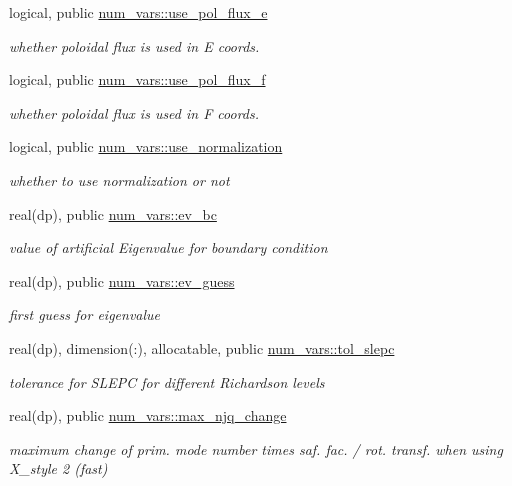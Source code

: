 \begin{DoxyCompactItemize}
logical, public \hyperlink{namespacenum__vars_adedd3c1e77cfdf75dac84e43ee54497a}{num\+\_\+vars\+::use\+\_\+pol\+\_\+flux\+\_\+e}
\begin{DoxyCompactList}\small\item\em whether poloidal flux is used in E coords. \end{DoxyCompactList}\item 
logical, public \hyperlink{namespacenum__vars_ae21ec57b791e369c3558c0eb3da1555b}{num\+\_\+vars\+::use\+\_\+pol\+\_\+flux\+\_\+f}
\begin{DoxyCompactList}\small\item\em whether poloidal flux is used in F coords. \end{DoxyCompactList}\item 
logical, public \hyperlink{namespacenum__vars_a585ed16ea01f299cd764690f057af2c6}{num\+\_\+vars\+::use\+\_\+normalization}
\begin{DoxyCompactList}\small\item\em whether to use normalization or not \end{DoxyCompactList}\item 
real(dp), public \hyperlink{namespacenum__vars_a4efc3cca2482236a18b8927bca8361c2}{num\+\_\+vars\+::ev\+\_\+bc}
\begin{DoxyCompactList}\small\item\em value of artificial Eigenvalue for boundary condition \end{DoxyCompactList}\item 
real(dp), public \hyperlink{namespacenum__vars_a4c19f47e50c92bfd52985761500a999e}{num\+\_\+vars\+::ev\+\_\+guess}
\begin{DoxyCompactList}\small\item\em first guess for eigenvalue \end{DoxyCompactList}\item 
real(dp), dimension(\+:), allocatable, public \hyperlink{namespacenum__vars_acbfccf15a8af9fce37f9cb3f2c85be76}{num\+\_\+vars\+::tol\+\_\+slepc}
\begin{DoxyCompactList}\small\item\em tolerance for S\+L\+E\+PC for different Richardson levels \end{DoxyCompactList}\item 
real(dp), public \hyperlink{namespacenum__vars_a2f7c3870fc9449cf70e4bf44612a8b9a}{num\+\_\+vars\+::max\+\_\+njq\+\_\+change}
\begin{DoxyCompactList}\small\item\em maximum change of prim. mode number times saf. fac. / rot. transf. when using X\+\_\+style 2 (fast) \end{DoxyCompactList}\item 

\end{DoxyCompactItemize}
